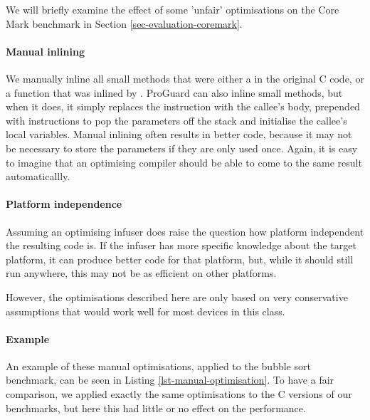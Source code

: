 We will briefly examine the effect of some 'unfair' optimisations on the Core Mark benchmark in Section \ref{sec-evaluation-coremark}.



\paragraph{Manual inlining}
We manually inline all small methods that were either a  in the original C code, or a function that was inlined by . ProGuard can also inline small methods, but when it does, it simply replaces the  instruction with the callee's body, prepended with  instructions to pop the parameters off the stack and initialise the callee's local variables. Manual inlining often results in better code, because it may not be necessary to store the parameters if they are only used once. Again, it is easy to imagine that an optimising compiler should be able to come to the same result automaticallly.

\paragraph{Platform independence}
Assuming an optimising infuser does raise the question how platform independent the resulting code is. If the infuser has more specific knowledge about the target platform, it can produce better code for that platform, but, while it should still run anywhere, this may not be as efficient on other platforms.

However, the optimisations described here are only based on very conservative assumptions that would work well for most devices in this class.

\paragraph{Example} An example of these manual optimisations, applied to the bubble sort benchmark, can be seen in Listing \ref{lst-manual-optimisation}. To have a fair comparison, we applied exactly the same optimisations to the C versions of our benchmarks, but here this had little or no effect on the performance.

